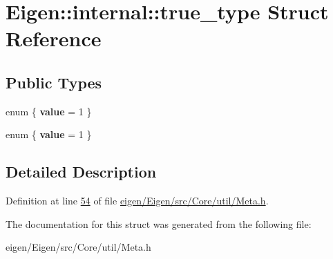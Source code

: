 \hypertarget{struct_eigen_1_1internal_1_1true__type}{}\section{Eigen\+:\+:internal\+:\+:true\+\_\+type Struct Reference}
\label{struct_eigen_1_1internal_1_1true__type}
\subsection*{Public Types}
\begin{DoxyCompactItemize}
\item 
\mbox{\label{struct_eigen_1_1internal_1_1true__type_a2dd3bc99257fd16866285f90e0c3c91b}} 
enum \{ {\bfseries value} = 1
 \}
\item 
\mbox{\label{struct_eigen_1_1internal_1_1true__type_afa8dc14b7fe993fca4c7ac5984597c21}} 
enum \{ {\bfseries value} = 1
 \}
\end{DoxyCompactItemize}


\subsection{Detailed Description}


Definition at line \hyperlink{eigen_2_eigen_2src_2_core_2util_2_meta_8h_source_l00054}{54} of file \hyperlink{eigen_2_eigen_2src_2_core_2util_2_meta_8h_source}{eigen/\+Eigen/src/\+Core/util/\+Meta.\+h}.



The documentation for this struct was generated from the following file\+:\begin{DoxyCompactItemize}
\item 
eigen/\+Eigen/src/\+Core/util/\+Meta.\+h\end{DoxyCompactItemize}
